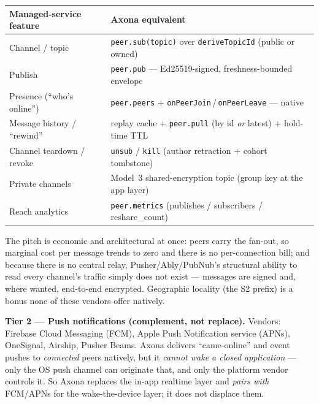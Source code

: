 \documentclass[nobib]{tufte-handout}
\begin{document}
\begin{fullwidth}
\par\medskip\noindent\small
\begin{tabular}{@{}p{}p{}@{}}
\toprule
\textbf{Managed-service feature} & \textbf{Axona equivalent} \\
\midrule
Channel / topic & \texttt{peer.sub(topic)} over \texttt{deriveTopicId} (public or owned) \\
Publish & \texttt{peer.pub} --- Ed25519-signed, freshness-bounded envelope \\
Presence (``who's online'') & \texttt{peer.peers} + \texttt{onPeerJoin}\,/\,\texttt{onPeerLeave} --- native \\
Message history / ``rewind'' & replay cache + \texttt{peer.pull} (by id \emph{or} latest) + hold-time TTL \\
Channel teardown / revoke & \texttt{unsub} / \texttt{kill} (author retraction + cohort tombstone) \\
Private channels & Model~3 shared-encryption topic (group key at the app layer) \\
Reach analytics & \texttt{peer.metrics} (publishes / subscribers / reshare\_count) \\
\bottomrule
\end{tabular}
\par{}
\par\medskip
\end{fullwidth}

The pitch is economic and architectural at once: peers carry the
fan-out, so marginal cost per message trends to zero and there is no
per-connection bill; and because there is no central relay,
Pusher/Ably/PubNub's structural ability to read every channel's traffic
simply does not exist --- messages are signed and, where wanted,
end-to-end encrypted. Geographic locality (the S2 prefix) is a bonus
none of these vendors offer natively.

\textbf{Tier 2 --- Push notifications (complement, not replace).}
Vendors: Firebase Cloud Messaging (FCM), Apple Push Notification service
(APNs), OneSignal, Airship, Pusher Beams. Axona delivers
``came-online'' and event pushes to \emph{connected} peers natively, but
it \emph{cannot wake a closed application} --- only the OS push channel
can originate that, and only the platform vendor controls it. So Axona
replaces the in-app realtime layer and \emph{pairs with} FCM/APNs for
the wake-the-device layer; it does not displace them.
\end{document}
